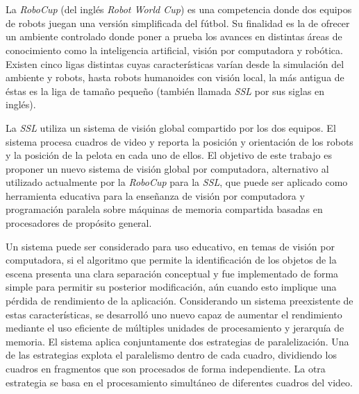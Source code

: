 \ \\
\ \\
\label{pagresum}
\\
\ \\
\ \\

\ \\

\ \\

La \emph{RoboCup} (del inglés \emph{Robot World Cup}) es una competencia donde
dos equipos de robots juegan una versión simplificada del fútbol. Su finalidad
es la de ofrecer un ambiente controlado donde poner a prueba los avances en
distintas áreas de conocimiento como la inteligencia artificial, visión por
computadora y robótica. Existen cinco ligas distintas cuyas características
varían desde la simulación del ambiente y robots, hasta robots humanoides con
visión local, la más antigua de éstas es la liga de tamaño pequeño (también
llamada \emph{SSL} por sus siglas en inglés).

La \emph{SSL} utiliza un sistema de visión global compartido por los dos
equipos.  El sistema procesa cuadros de video y reporta la posición y
orientación de los robots y la posición de la pelota en cada uno de ellos. El
objetivo de este trabajo es proponer un nuevo sistema de visión global por
computadora, alternativo al utilizado actualmente por la \emph{RoboCup} para la
\emph{SSL}, que puede ser aplicado como herramienta educativa para la enseñanza
de visión por computadora y programación paralela sobre máquinas de memoria
compartida basadas en procesadores de propósito general.

Un sistema puede ser considerado para uso educativo, en temas de visión por
computadora, si el algoritmo que permite la identificación de los objetos de la
escena presenta una clara separación conceptual y fue implementado de forma
simple para permitir su posterior modificación, aún cuando esto implique una
pérdida de rendimiento de la aplicación. Considerando un sistema preexistente
de estas características, se desarrolló uno nuevo capaz de aumentar el
rendimiento mediante el uso eficiente de múltiples unidades de procesamiento y
jerarquía de memoria. El sistema aplica conjuntamente dos estrategias de
paralelización. Una de las estrategias explota el paralelismo dentro de cada
cuadro, dividiendo los cuadros en fragmentos que son procesados de forma
independiente. La otra estrategia se basa en el procesamiento simultáneo de
diferentes cuadros del video.

